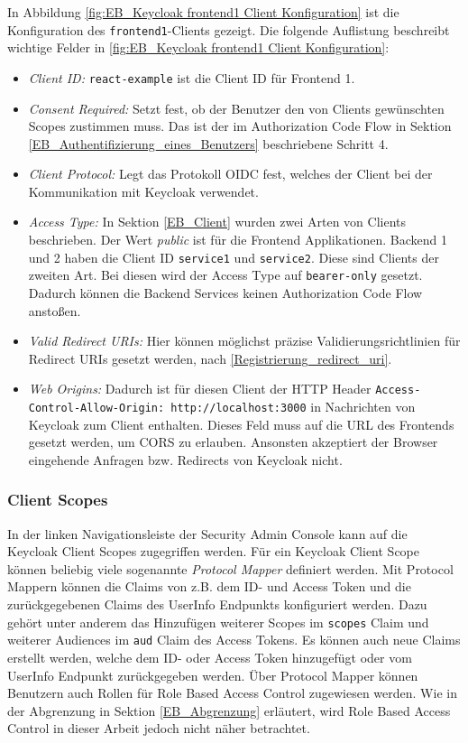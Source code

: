 In Abbildung \ref{fig:EB_Keycloak frontend1 Client Konfiguration} ist die Konfiguration des \texttt{frontend1}-Clients gezeigt. Die folgende Auflistung beschreibt wichtige Felder in \ref{fig:EB_Keycloak frontend1 Client Konfiguration}:
\begin{itemize}
	\item \emph{Client ID:} \texttt{react-example} ist die Client ID für Frontend 1.
	
	\item \emph{Consent Required:} Setzt fest, ob der Benutzer den von Clients gewünschten Scopes zustimmen muss. Das ist der im Authorization Code Flow in Sektion \ref{EB_Authentifizierung_eines_Benutzers} beschriebene Schritt 4.
	
	\item \emph{Client Protocol:} Legt das Protokoll OIDC fest, welches der Client bei der Kommunikation mit Keycloak verwendet.
	
	\item \emph{Access Type:} In Sektion \ref{EB_Client} wurden zwei Arten von Clients beschrieben. Der Wert \textit{public} ist für die Frontend Applikationen. Backend 1 und 2 haben die Client ID \texttt{service1} und \texttt{service2}. Diese sind Clients der zweiten Art. Bei diesen wird der Access Type auf \texttt{bearer-only} gesetzt. Dadurch können die Backend Services keinen Authorization Code Flow anstoßen.
	
	\item \emph{Valid Redirect URIs:} Hier können möglichst präzise Validierungsrichtlinien für Redirect URIs gesetzt werden, nach \ref{Registrierung_redirect_uri}.
	
	\item \emph{Web Origins:} Dadurch ist für diesen Client der HTTP Header \texttt{Access-Control-Allow-Origin: http://localhost:3000} in Nachrichten von Keycloak zum Client enthalten. Dieses Feld muss auf die URL des Frontends gesetzt werden, um CORS zu erlauben. Ansonsten akzeptiert der Browser eingehende Anfragen bzw. Redirects von Keycloak nicht.
\end{itemize}

\subsubsection{Client Scopes}

In der linken Navigationsleiste der Security Admin Console kann auf die Keycloak Client Scopes zugegriffen werden. Für ein Keycloak Client Scope können beliebig viele sogenannte \textit{Protocol Mapper} definiert werden. Mit Protocol Mappern können die Claims von z.B. dem ID- und Access Token und die zurückgegebenen Claims des UserInfo Endpunkts konfiguriert werden. Dazu gehört unter anderem das Hinzufügen weiterer Scopes im \texttt{scopes} Claim und weiterer Audiences im \texttt{aud} Claim des Access Tokens. Es können auch neue Claims erstellt werden, welche dem ID- oder Access Token hinzugefügt oder vom UserInfo Endpunkt zurückgegeben werden. Über Protocol Mapper können Benutzern auch Rollen für Role Based Access Control zugewiesen werden. Wie in der Abgrenzung in Sektion \ref{EB_Abgrenzung} erläutert, wird Role Based Access Control in dieser Arbeit jedoch nicht näher betrachtet. 

